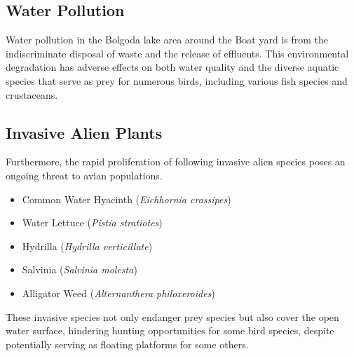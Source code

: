 \subsection{Water Pollution}
Water pollution in the Bolgoda lake area around the Boat yard is from the indiscriminate disposal of waste and the release of effluents. This environmental degradation has adverse effects on both water quality and the diverse aquatic species that serve as prey for numerous birds, including various fish species and crustaceans.
\subsection{Invasive Alien Plants}
Furthermore, the rapid proliferation of following invasive alien species poses an ongoing threat to avian populations.

\begin{itemize}
\item Common Water Hyacinth (\textit{Eichhornia crassipes})
\item Water Lettuce (\textit{Pistia stratiotes})
\item Hydrilla (\textit{Hydrilla verticillate})
\item Salvinia (\textit{Salvinia molesta})
\item Alligator Weed (\textit{Alternanthera philoxeroides})
\end{itemize}
These invasive species not only endanger prey species but also cover the open water surface, hindering hunting opportunities for some bird species, despite potentially serving as floating platforms for some others.
